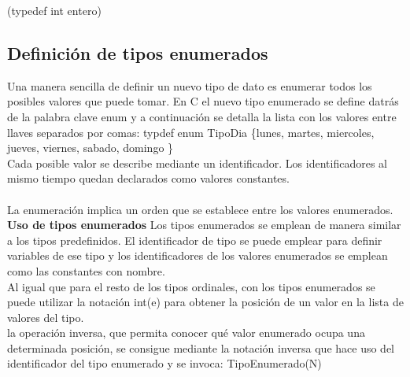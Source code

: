 \documentclass[11pt,a4paper]{article}
\begin{document}
  (typedef int entero)
  \subsection{Definición de tipos enumerados}
  Una manera sencilla de definir un nuevo tipo de dato es enumerar todos los posibles valores que puede tomar. En C el nuevo tipo enumerado se define datrás de la palabra clave enum y a continuación se detalla la lista con los valores entre llaves separados por comas: typdef enum TipoDia \{lunes, martes, miercoles, jueves, viernes, sabado, domingo \}\\
  Cada posible valor se describe mediante un identificador.
  Los identificadores al mismo tiempo quedan declarados como valores constantes.\\
  \\
  La enumeración implica un orden que se establece entre los valores enumerados.\\
  \textbf{Uso de tipos enumerados}
  Los tipos enumerados se emplean de manera similar a los tipos predefinidos.
  El identificador de tipo se puede emplear para definir variables de ese tipo y los identificadores de los valores enumerados se emplean como las constantes con nombre.\\
  Al igual que para el resto de los tipos ordinales, con los tipos enumerados se
  puede utilizar la notación int(e) para obtener la posición de un valor en la
  lista de valores del tipo.
  \\
  la operación inversa, que permita conocer qué valor enumerado ocupa una
  determinada posición, se consigue mediante la notación inversa que hace uso del identificador del tipo enumerado y se invoca: TipoEnumerado(N)\\
  
\end{document}
